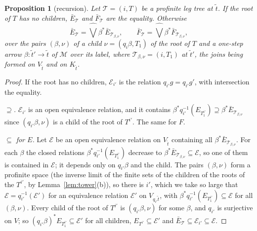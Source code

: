 \documentclass[11pt]{amsart}
\newtheorem{prop}[thm]{Proposition}
\theoremstyle{definition}
\newcommand{\cM}{\mathcal M}
\begin{document}
\begin{prop}[recursion]\label{prop:rec}
Let $\mathcal T=(i,T)$ be a profinite leg tree at $\tilde t$. If the
root of $T$ has no children, $\bar E_{\mathcal T}$ and $\bar
F_{\mathcal T}$ are the equality. Otherwise
\[
\bar E_{\mathcal T}=\widehat\bigvee\beta^*\bar E_{\mathcal T_{\beta,\nu}},
\qquad\bar F_{\mathcal T}=\widehat\bigvee\beta^*\bar F_{\mathcal T_{\beta,\nu}},
\]
over the pairs $(\beta,\nu)$ of a child $\nu=(q_i\beta,T_1)$ of the
root of $T$ and a one-step arrow $\beta\colon\tilde t'\to\tilde t$ of
$\cM$ over its label, where $\mathcal T_{\beta,\nu}=(i,T_1)$ at $\tilde t'$, the
joins being formed on $V_{\tilde t}$ and on $K_{\tilde t}$.
\end{prop}
\begin{proof}
If the root has no children, $\mathcal E_{i'}$ is the relation
$q_{i'}g=q_{i'}g'$, with intersection the equality.

\emph{$\supseteq$.} $\mathcal E_{i'}$ is an open equivalence relation,
and it contains $\beta^*q_{i'}^{-1}(E_{T_1^{i'}})\supseteq\beta^*\bar
E_{\mathcal T_{\beta,\nu}}$ since $(q_{i'}\beta,\nu)$ is a child of the root
of $T^{i'}$. The same for $F$.

\emph{$\subseteq$ for $E$.} Let $\mathcal E$ be an open equivalence
relation on $V_{\tilde t}$ containing all $\beta^*\bar E_{\mathcal T_{\beta,\nu}}$. For each $\beta$ the closed relations $\beta^*q_{i'}^{-1}
(E_{T_1^{i'}})$ decrease to $\beta^*\bar E_{\mathcal T_{\beta,\nu}}\subseteq
\mathcal E$, so one of them is contained in $\mathcal E$; it depends
only on $q_{i'}\beta$ and the child. The pairs $(\beta,\nu)$ form a
profinite space (the inverse limit of the finite sets of the children
of the roots of the $T^{i'}$, by Lemma~\ref{lem:tower}(b)), so there is
$i'$, which we take so large that $\mathcal E=q_{i'}^{-1}(\mathcal
E')$ for an equivalence relation $\mathcal E'$ on $V_{q_{i'}\tilde
t}$, with $\beta^*q_{i'}^{-1}(E_{T_1^{i'}})\subseteq\mathcal E$ for
all $(\beta,\nu)$. Every child of the root of $T^{i'}$ is $(q_{i'}
\beta,\nu)$ for some $\beta$, and $q_{i'}$ is surjective on $V$; so
$(q_{i'}\beta)^*E_{T_1^{i'}}\subseteq\mathcal E'$ for all children,
$E_{T^{i'}}\subseteq\mathcal E'$ and $\bar E_{\mathcal T}\subseteq
\mathcal E_{i'}\subseteq\mathcal E$.


\end{proof}
\end{document}
